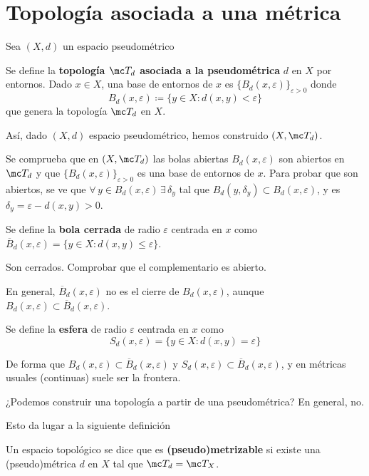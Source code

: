 \section{Topolog\'ia asociada a una m\'etrica}
Sea $(X, d)$ un espacio pseudom\'etrico
\begin{defi}
    Se define la \textbf{topolog\'ia $\mc T_d$ asociada a la pseudom\'etrica} $d$ en $X$ por entornos. Dado $x\in X$, una base de entornos de $x$ es $\{B_d(x, \varepsilon)\}_{\varepsilon > 0}$ donde 
    $$B_d(x, \varepsilon) \coloneqq \{y \in X : d(x, y) < \varepsilon\}$$
    que genera la topolog\'ia $\mc T_d$ en $X$.
\end{defi}
As\'i, dado $(X,d)$ espacio pseudom\'etrico, hemos construido $(X, \mc T_d)$.
\begin{ejer}
    Se comprueba que en $(X,\mc T_d)$ las bolas abiertas $B_d(x, \varepsilon)$ son abiertos en $\mc T_d$ y que $\{B_d(x, \varepsilon)\}_{\varepsilon > 0}$ es una base de entornos de $x$. Para probar que son abiertos, se ve que $\forall \, y \in B_d(x, \varepsilon) \, \exists \, \delta_y$ tal que $B_d(y, \delta_y) \subset B_d(x, \varepsilon)$, y es $\delta_y = \varepsilon - d(x, y) > 0$.
\end{ejer}
\begin{defi}
    Se define la \textbf{bola cerrada} de radio $\varepsilon$ centrada en $x$ como $\overline{B}_d(x, \varepsilon) = \{y \in X : d(x, y) \le \varepsilon\}$.
\end{defi}
\begin{ejer}
    Son cerrados. Comprobar que el complementario es abierto.
\end{ejer}
\begin{obs}
    En general, $\overline{B}_d(x, \varepsilon)$ no es el cierre de $B_d(x, \varepsilon)$, aunque $B_d(x, \varepsilon) \subset \overline{B}_d(x, \varepsilon)$.
\end{obs}
\begin{defi}
    Se define la \textbf{esfera} de radio $\varepsilon$ centrada en $x$ como
    $$S_d(x, \varepsilon) = \{y \in X : d(x, y) = \varepsilon\}$$
\end{defi}

De forma que $B_d(x, \varepsilon) \subset \overline{B}_d(x, \varepsilon)$ y $S_d(x, \varepsilon) \subset \overline{B}_d(x, \varepsilon)$, y en m\'etricas usuales (continuas) suele ser la frontera.

¿Podemos construir una topología a partir de una pseudométrica? En general, no.

Esto da lugar a la siguiente definici\'on
\begin{defi}
    Un espacio topol\'ogico se dice que es \textbf{(pseudo)metrizable} si existe una (pseudo)m\'etrica $d$ en $X$ tal que $\mc T_d = \mc T_X$.
\end{defi}

